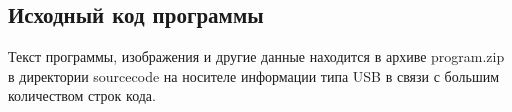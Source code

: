 \subsection{Исходный код программы}
Текст программы, изображения и другие данные находится в архиве program.zip в директории sourcecode на носителе информации типа USB в связи с большим количеством строк кода.
